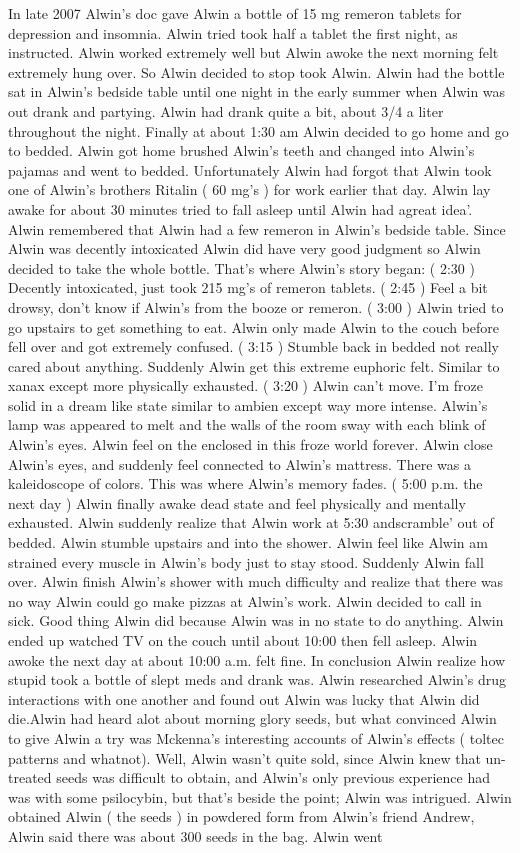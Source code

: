 \documentclass[12pt]{book}
\begin{document}
In late 2007 Alwin's doc gave Alwin a bottle of 15 mg remeron tablets for depression and insomnia. Alwin tried took half a tablet the first night, as instructed. Alwin worked extremely well but Alwin awoke the next morning felt extremely hung over. So Alwin decided to stop took Alwin. Alwin had the bottle sat in Alwin's bedside table until one night in the early summer when Alwin was out drank and partying. Alwin had drank quite a bit, about 3/4 a liter throughout the night. Finally at about 1:30 am Alwin decided to go home and go to bedded. Alwin got home brushed Alwin's teeth and changed into Alwin's pajamas and went to bedded. Unfortunately Alwin had forgot that Alwin took one of Alwin's brothers Ritalin ( 60 mg's ) for work earlier that day. Alwin lay awake for about 30 minutes tried to fall asleep until Alwin had agreat idea'. Alwin remembered that Alwin had a few remeron in Alwin's bedside table. Since Alwin was decently intoxicated Alwin did have very good judgment so Alwin decided to take the whole bottle. That's where Alwin's story began: ( 2:30 ) Decently intoxicated, just took 215 mg's of remeron tablets. ( 2:45 ) Feel a bit drowsy, don't know if Alwin's from the booze or remeron. ( 3:00 ) Alwin tried to go upstairs to get something to eat. Alwin only made Alwin to the couch before fell over and got extremely confused. ( 3:15 ) Stumble back in bedded not really cared about anything. Suddenly Alwin get this extreme euphoric felt. Similar to xanax except more physically exhausted. ( 3:20 ) Alwin can't move. I'm froze solid in a dream like state similar to ambien except way more intense. Alwin's lamp was appeared to melt and the walls of the room sway with each blink of Alwin's eyes. Alwin feel on the enclosed in this froze world forever. Alwin close Alwin's eyes, and suddenly feel connected to Alwin's mattress. There was a kaleidoscope of colors. This was where Alwin's memory fades. ( 5:00 p.m. the next day ) Alwin finally awake dead state and feel physically and mentally exhausted. Alwin suddenly realize that Alwin work at 5:30 andscramble' out of bedded. Alwin stumble upstairs and into the shower. Alwin feel like Alwin am strained every muscle in Alwin's body just to stay stood. Suddenly Alwin fall over. Alwin finish Alwin's shower with much difficulty and realize that there was no way Alwin could go make pizzas at Alwin's work. Alwin decided to call in sick. Good thing Alwin did because Alwin was in no state to do anything. Alwin ended up watched TV on the couch until about 10:00 then fell asleep. Alwin awoke the next day at about 10:00 a.m. felt fine. In conclusion Alwin realize how stupid took a bottle of slept meds and drank was. Alwin researched Alwin's drug interactions with one another and found out Alwin was lucky that Alwin did die.Alwin had heard alot about morning glory seeds, but what convinced Alwin to give Alwin a try was Mckenna's interesting accounts of Alwin's effects ( toltec patterns and whatnot). Well, Alwin wasn't quite sold, since Alwin knew that un-treated seeds was difficult to obtain, and Alwin's only previous experience had was with some psilocybin, but that's beside the point; Alwin was intrigued. Alwin obtained Alwin ( the seeds ) in powdered form from Alwin's friend Andrew, Alwin said there was about 300 seeds in the bag. Alwin went 
\end{document}
